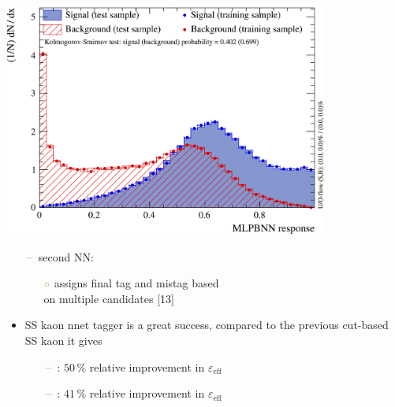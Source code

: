 {\begin{minipage}{0.474\boxwidth}
\begin{itemize}
\begin{flushleft}
\includegraphics[width=0.802\textwidth]{figures/sskaonNnetfirstNN3.png}
\end{flushleft}

\vspace{-2.3em}

\setlength\itemsep{0.01em}
\setlength{\itemindent}{-.11in}
\begin{itemize}
\setlength{\itemindent}{-.11in}
\item[${\color{tu_gruen}-}$] second NN:
\begin{itemize}
\item[${\color{tu_gruen}\circ}$] assigns final tag and mistag  based\\ on multiple candidates [13]
\end{itemize}
\end{itemize}
\end{itemize}
\vspace{-1.75em}
\begin{itemize}
\setlength\itemsep{0.01em}
\item SS kaon nnet tagger is a great success, compared \newline to the previous cut-based SS kaon it gives  
\begin{itemize}
\setlength{\itemindent}{-.11in}
\vspace{-0.5em}
\item[${\color{tu_gruen}-}$] \BsToDspi: $50\,\%$ relative improvement in $\varepsilon_{\text{eff}}$
\item[${\color{tu_gruen}-}$] \BsToJPsiPhi: $41\,\%$ relative improvement in $\varepsilon_{\text{eff}}$
\end{itemize}
\end{itemize}
\vspace{-0.75em}
\end{minipage}
}




